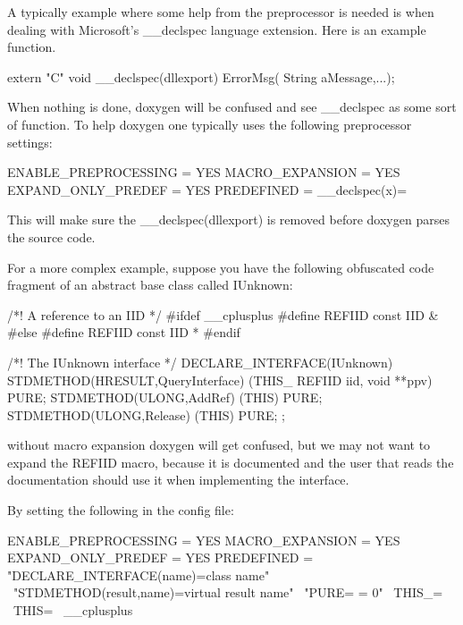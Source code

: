 A typically example where some help from the preprocessor is needed is when dealing with Microsoft's \_\-\_\-declspec language extension. Here is an example function.

\begin{DoxyVerb}
extern "C" void __declspec(dllexport) ErrorMsg( String aMessage,...);
\end{DoxyVerb}


When nothing is done, doxygen will be confused and see \_\-\_\-declspec as some sort of function. To help doxygen one typically uses the following preprocessor settings:

\begin{DoxyVerb}
ENABLE_PREPROCESSING   = YES
MACRO_EXPANSION        = YES
EXPAND_ONLY_PREDEF     = YES
PREDEFINED             = __declspec(x)=
\end{DoxyVerb}


This will make sure the \_\-\_\-declspec(dllexport) is removed before doxygen parses the source code.

For a more complex example, suppose you have the following obfuscated code fragment of an abstract base class called {\ttfamily IUnknown:} 

\begin{DoxyVerb}
/*! A reference to an IID */
#ifdef __cplusplus
#define REFIID const IID &
#else
#define REFIID const IID *
#endif


/*! The IUnknown interface */
DECLARE_INTERFACE(IUnknown)
{
  STDMETHOD(HRESULT,QueryInterface) (THIS_ REFIID iid, void **ppv) PURE;
  STDMETHOD(ULONG,AddRef) (THIS) PURE;
  STDMETHOD(ULONG,Release) (THIS) PURE;
};
\end{DoxyVerb}


without macro expansion doxygen will get confused, but we may not want to expand the REFIID macro, because it is documented and the user that reads the documentation should use it when implementing the interface.

By setting the following in the config file:

\begin{DoxyVerb}
ENABLE_PREPROCESSING = YES
MACRO_EXPANSION      = YES
EXPAND_ONLY_PREDEF   = YES
PREDEFINED           = "DECLARE_INTERFACE(name)=class name" \
                       "STDMETHOD(result,name)=virtual result name" \
                       "PURE= = 0" \
                       THIS_= \
                       THIS= \
		       __cplusplus
\end{DoxyVerb}


